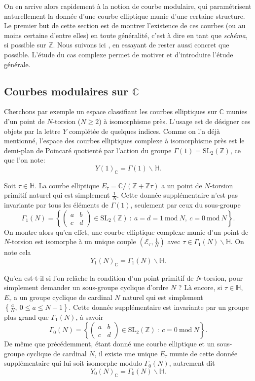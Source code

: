 \documentclass[11pt,a4paper]{article}
\newcommand{\Z}{\mathbb{Z}}
\newcommand{\C}{\mathbb{C}}
\newcommand{\E}{\mathcal{E}}
\renewcommand{\H}{\mathbb{H}}
\renewcommand{\b}{\backslash}
\renewcommand{\mod}{\ \mathrm{mod}\ }
\theoremstyle{definition}
\begin{document}
On en arrive alors rapidement à la notion de courbe modulaire, qui paramétrisent naturellement la donnée d'une courbe elliptique munie d'une certaine structure. Le premier but de cette section est de montrer l'existence de ces courbes (ou au moins certaine d'entre elles) en toute généralité, c'est à dire en tant que \emph{schéma}, si possible sur $\Z$. Nous suivons ici \cite{KaMa}, en essayant de rester aussi concret que possible. L'étude du cas complexe permet de motiver et d'introduire l'étude générale.


\subsection{Courbes modulaires sur $\C$}

Cherchons par exemple un espace classifiant les courbes elliptiques sur $\C$ munies d'un point de $N$-torsion ($N\geq 2$) à isomorphisme près. L'usage est de désigner ces objets par la lettre $Y$ complétée de quelques indices. Comme on l'a déjà mentionné, l'espace des courbes elliptiques complexe à isomorphisme près est le demi-plan de Poincaré quotienté par l'action du groupe $\Gamma(1) = \mathrm{SL}_2(\Z)$, ce que l'on note:
$$Y(1)_\C = \Gamma(1) \b \H.$$

Soit $\tau\in \H$. La courbe elliptique $E_\tau = \C/(\Z+\Z\tau)$ a un point de $N$-torsion primitif naturel qui est simplement $\frac{1}{N}$. Cette donnée supplémentaire n'est pas invariante par tous les éléments de $\Gamma(1)$, seulement par ceux du sous-groupe
$$\Gamma_1(N) = \left\{\left(
\begin{matrix}
a & b \\
c & d
\end{matrix}
\right) \in \mathrm{SL}_2(\Z)\ :\ a = d = 1 \mod{N},\ c = 0\mod{N}\right\}.$$
On montre alors qu'en effet, une courbe elliptique complexe munie d'un point de $N$-torsion est isomorphe à un unique couple $\left(\E_\tau, \frac{1}{N}\right)$ avec $\tau\in \Gamma_1(N) \b \H$. On note cela
$$Y_1(N)_\C = \Gamma_1(N) \b \H.$$

Qu'en est-t-il si l'on relâche la condition d'un point primitif de $N$-torsion, pour simplement demander un sous-groupe cyclique d'ordre $N$ ? Là encore, si $\tau\in \H$, $E_\tau$ a un groupe cyclique de cardinal $N$ naturel qui est simplement $\left\{\frac{a}{N},\ 0\leq a\leq N-1\right\}$. Cette donnée supplémentaire est invariante par un groupe plus grand que $\Gamma_1(N)$, à savoir
$$\Gamma_0(N) = \left\{\left(
\begin{matrix}
a & b \\
c & d
\end{matrix}
\right) \in \mathrm{SL}_2(\Z)\ :\ c = 0\mod{N}\right\}.$$
De même que précédemment, étant donné une courbe elliptique et un sous-groupe cyclique de cardinal $N$, il existe une unique $E_\tau$ munie de cette donnée supplémentaire qui lui soit isomorphe modulo $\Gamma_0(N)$, autrement dit
$$Y_0(N)_\C = \Gamma_0(N) \b \H.$$
\end{document}
